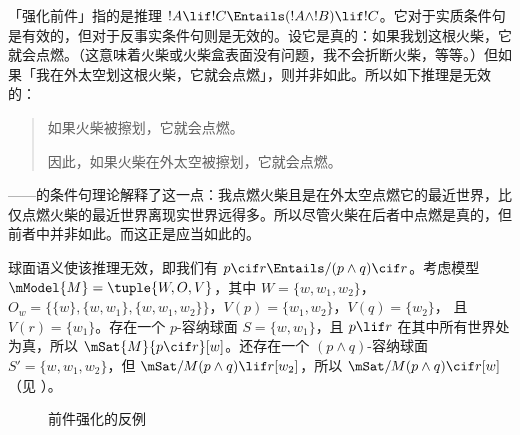 \documentclass[../../../include/open-logic-section]{subfiles}
\begin{document}


「强化前件」指的是推理 $!A \lif !C \Entails (!A \land !B) \lif !C$。它对于实质条件句是有效的，但对于反事实条件句则是无效的。设它是真的：如果我划这根火柴，它就会点燃。（这意味着火柴或火柴盒表面没有问题，我不会折断火柴，等等。）但如果「我在外太空划这根火柴，它就会点燃」，则并非如此。所以如下推理是无效的：
\begin{quote}
  如果火柴被擦划，它就会点燃。

  因此，如果火柴在外太空被擦划，它就会点燃。
\end{quote}

——的条件句理论解释了这一点：我点燃火柴且是在外太空点燃它的最近世界，比仅点燃火柴的最近世界离现实世界远得多。所以尽管火柴在后者中点燃是真的，但前者中并非如此。而这正是应当如此的。

\begin{ex}
  球面语义使该推理无效，即我们有 $p
  \cif r \Entails/ (p \land q) \cif r$。考虑模型 $\mModel{M}
  = \tuple{W, O, V}$，其中 $W = \{w, w_1, w_2\}$，$O_w = \{\{w\}, \{w,
  w_1\}, \{w, w_1, w_2\}\}$，$V(p) = \{w_1, w_2\}$，$V(q) = \{w_2\}$，
  且 $V(r) = \{w_1\}$。存在一个 $p$-容纳球面 $S = \{w,
  w_1\}$，且 $p \lif r$ 在其中所有世界处为真，所以 $\mSat{M}{p
    \cif r}[w]$。还存在一个 $(p \land q)$-容纳球面 $S' =
  \{w, w_1, w_2\}$，但 $\mSat/{M}{(p \land q) \lif r}[w_2]$，所以
  $\mSat/{M}{(p \land q) \cif r}[w]$（见 ）。

\begin{figure}
\begin{center}
\caption{前件强化的反例}
\end{center}
\end{figure}
\end{ex}
\end{document}
